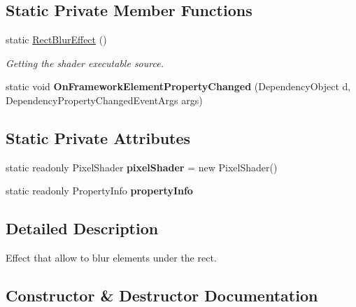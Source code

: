 \subsection*{Static Private Member Functions}
\begin{DoxyCompactItemize}
\item 
static \mbox{\hyperlink{class_wpf_handler_1_1_u_i_1_1_effects_1_1_rect_blur_effect_a2f78d40f98a923f23467fb795a1d301c}{Rect\+Blur\+Effect}} ()
\begin{DoxyCompactList}\small\item\em Getting the shader executable source. \end{DoxyCompactList}\item 
\mbox{\label{class_wpf_handler_1_1_u_i_1_1_effects_1_1_rect_blur_effect_a194ef2243516f91ffb4ecb0419fdb634}} 
static void {\bfseries On\+Framework\+Element\+Property\+Changed} (Dependency\+Object d, Dependency\+Property\+Changed\+Event\+Args args)
\end{DoxyCompactItemize}
\subsection*{Static Private Attributes}
\begin{DoxyCompactItemize}
\item 
\mbox{\label{class_wpf_handler_1_1_u_i_1_1_effects_1_1_rect_blur_effect_a851f73004a1a6030ac85d0d36d5d074e}} 
static readonly Pixel\+Shader {\bfseries pixel\+Shader} = new Pixel\+Shader()
\item 
\mbox{\label{class_wpf_handler_1_1_u_i_1_1_effects_1_1_rect_blur_effect_a87d037dc36ff72dbeff3fce597331eb0}} 
static readonly Property\+Info {\bfseries property\+Info}
\end{DoxyCompactItemize}


\subsection{Detailed Description}
Effect that allow to blur elements under the rect. 



\subsection{Constructor \& Destructor Documentation}
\mbox{\label{class_wpf_handler_1_1_u_i_1_1_effects_1_1_rect_blur_effect_a2f78d40f98a923f23467fb795a1d301c}} 
